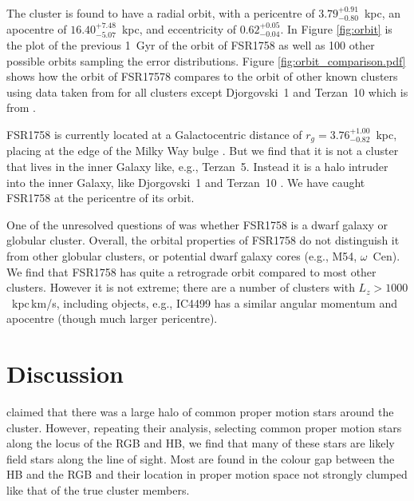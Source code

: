 \documentclass[fleqn,usenatbib,letters]{mnras}
\begin{document}
The cluster is found to have a radial orbit, with a pericentre of $3.79_{-0.80}^{+0.91}$~kpc, an apocentre of $16.40_{-5.07}^{+7.48}$~kpc, and eccentricity of $0.62_{-0.04}^{+0.05}$. In Figure \ref{fig:orbit} is the plot of the previous 1~Gyr of the orbit of FSR1758 as well as 100 other possible orbits sampling the error distributions. Figure \ref{fig:orbit_comparison.pdf} shows how the orbit of FSR17578 compares to the orbit of other known clusters using data taken from \citet{Vasiliev:2018uf} for all clusters except Djorgovski~1 and Terzan~10 which is from \citet{Ortolani2019}.

FSR1758 is currently located at a Galactocentric distance of $r_g = 3.76_{-0.82}^{+1.00}$~kpc, placing at the edge of the Milky Way bulge \citep[$\sim2$~kpc across;][]{Barbuy2018}. But we find that it is not a cluster that lives in the inner Galaxy like, e.g., Terzan~5. Instead it is a halo intruder into the inner Galaxy, like Djorgovski~1 and Terzan~10 \citep{Ortolani2019}. We have caught FSR1758 at the pericentre of its orbit.

One of the unresolved questions of \citet{Barba2018} was whether FSR1758 is a dwarf galaxy or globular cluster. Overall, the orbital properties of FSR1758 do not distinguish it from other globular clusters, or potential dwarf galaxy cores (e.g., M54, $\omega$~Cen). We find that FSR1758 has quite a retrograde orbit compared to most other clusters. However it is not extreme; there are a number of clusters with $L_z > 1000$~kpc\,km/s, including objects, e.g., IC4499 has a similar angular momentum and apocentre (though much larger pericentre).


\section{Discussion}

\citet{Barba2018} claimed that there was a large halo of common proper motion stars around the cluster. However, repeating their analysis, selecting common proper motion stars along the locus of the RGB and HB, we find that many of these stars are likely field stars along the line of sight. Most are found in the colour gap between the HB and the RGB and their location in proper motion space not strongly clumped like that of the true cluster members.
\end{document}
